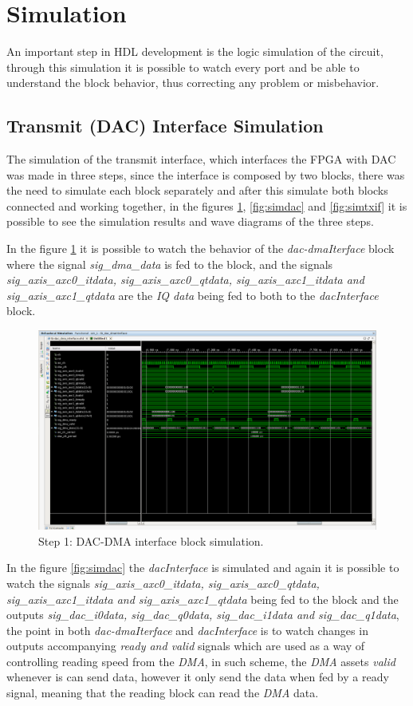 \vfill
\clearpage

\section{Simulation}

An important step in HDL development is the logic simulation of the circuit,
through this simulation it is possible to watch every port and be able to
understand the block behavior, thus correcting any problem or misbehavior.

\subsection{Transmit (DAC) Interface Simulation}

The simulation of the transmit interface, which interfaces the FPGA with DAC was
made in three steps, since the interface is composed by two blocks, there was
the need to simulate each block separately and after this simulate both blocks
connected and working together, in the figures \ref{fig:simdacdma},
\ref{fig:simdac} and \ref{fig:simtxif} it is possible to see the simulation
results and wave diagrams of the three steps.

In the figure \ref{fig:simdacdma} it is possible to watch the behavior of the
\textit{dac-dmaIterface} block where the signal \textit{sig\_dma\_data} is fed to
the block, and the signals \textit{ sig\_axis\_axc0\_itdata, sig\_axis\_axc0\_qtdata,
sig\_axis\_axc1\_itdata and sig\_axis\_axc1\_qtdata} are the \textit{IQ data} being
fed to both to the \textit{dacInterface} block.

\begin{figure}[htbp]
    \centering
    \includegraphics[height=.3\textwidth, width=.85\textwidth,
    trim={{.13\textwidth} {.90\textwidth} {.05\textwidth} {.15\textwidth}},
    clip]{./figures/dac_dmaInterface}
    \caption{ Step 1: DAC-DMA interface block simulation.
    \label{fig:simdacdma}}
\end{figure}

 In the figure \ref{fig:simdac} the \textit{dacInterface} is simulated and again
 it is possible to watch the signals \textit{sig\_axis\_axc0\_itdata,
 sig\_axis\_axc0\_qtdata, sig\_axis\_axc1\_itdata and sig\_axis\_axc1\_qtdata} being fed
 to the block and the outputs \textit{sig\_dac\_i0data, sig\_dac\_q0data,
 sig\_dac\_i1data and sig\_dac\_q1data}, the point in both \textit{dac-dmaIterface}
 and \textit{dacInterface} is to watch changes in outputs accompanying
 \textit{ready and valid} signals which are used as a way of controlling reading
 speed from the \textit{DMA}, in such scheme, the \textit{DMA} assets
 \textit{valid} whenever is can send data, however it only send the data when
 fed by a ready signal, meaning that the reading block can read the \textit{DMA}
 data.

